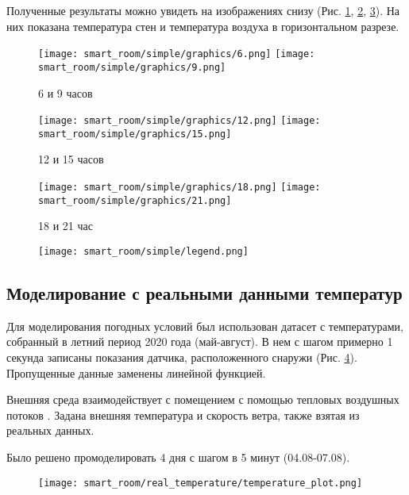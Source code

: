 Полученные результаты можно увидеть на изображениях снизу (Рис. \ref{6-9}, \ref{12-15}, \ref{18-21}). На них показана температура стен и температура воздуха в горизонтальном разрезе.

\begin{figure}[H]
\texttt{[image: smart\_room/simple/graphics/6.png]}\hfill
\texttt{[image: smart\_room/simple/graphics/9.png]}
\caption{6 и 9 часов}
\label{6-9}
\end{figure}

\begin{figure}[H]
\texttt{[image: smart\_room/simple/graphics/12.png]}\hfill
\texttt{[image: smart\_room/simple/graphics/15.png]}
\caption{12 и 15 часов}
\label{12-15}
\end{figure}

\begin{figure}[H]
\texttt{[image: smart\_room/simple/graphics/18.png]}\hfill
\texttt{[image: smart\_room/simple/graphics/21.png]}
\caption{18 и 21 час}
\label{18-21}
\end{figure}

\begin{figure}[H]
\texttt{[image: smart\_room/simple/legend.png]}\hfill
\end{figure}
\newpage


\subsection{Моделирование с реальными данными температур}

Для моделирования погодных условий был использован датасет с температурами, собранный в летний период 2020 года (май-август). В нем с шагом примерно 1 секунда записаны показания датчика, расположенного снаружи (Рис. \ref{real-temperature-plot}). Пропущенные данные заменены линейной функцией.

Внешняя среда взаимодействует с помещением с помощью тепловых воздушных потоков \cite{heat-flux}. Задана внешняя температура и скорость ветра, также взятая из реальных данных. 

Было решено промоделировать 4 дня с шагом в 5 минут (04.08-07.08). 

\begin{figure}[H]
\centering
\texttt{[image: smart\_room/real\_temperature/temperature\_plot.png]}
\caption{}
\label{real-temperature-plot}
\end{figure}

